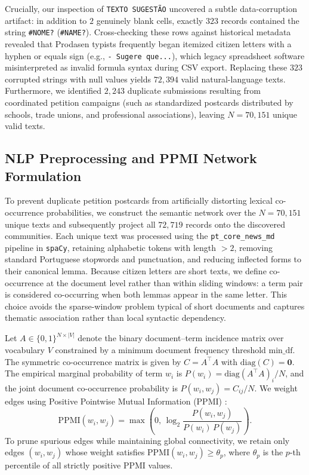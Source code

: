 \documentclass[pdflatex,sn-mathphys,iicol]{sn-jnl}
\begin{document}
Crucially, our inspection of \texttt{TEXTO SUGEST\~{A}O} uncovered a subtle data-corruption artifact: in addition to $2$ genuinely blank cells, exactly $323$ records contained the string \texttt{\#NOME?} (\texttt{\#NAME?}). Cross-checking these rows against historical metadata revealed that Prodasen typists frequently began itemized citizen letters with a hyphen or equals sign (e.g., \texttt{- Sugere que...}), which legacy spreadsheet software misinterpreted as invalid formula syntax during CSV export. Replacing these $323$ corrupted strings with null values yields $72,394$ valid natural-language texts. Furthermore, we identified $2,243$ duplicate submissions resulting from coordinated petition campaigns (such as standardized postcards distributed by schools, trade unions, and professional associations), leaving $N = 70,151$ unique valid texts.

\subsection{NLP Preprocessing and PPMI Network Formulation}
To prevent duplicate petition postcards from artificially distorting lexical co-occurrence probabilities, we construct the semantic network over the $N = 70,151$ unique texts and subsequently project all $72,719$ records onto the discovered communities. Each unique text was processed using the \texttt{pt\_core\_news\_md} pipeline in \texttt{spaCy}, retaining alphabetic tokens with length $>2$, removing standard Portuguese stopwords and punctuation, and reducing inflected forms to their canonical lemma. %
Because citizen letters are short texts, we define co-occurrence at the document level rather than within sliding windows: a term pair is considered co-occurring when both lemmas appear in the same letter. This choice avoids the sparse-window problem typical of short documents and captures thematic association rather than local syntactic dependency.

Let $A \in \{0,1\}^{N \times |V|}$ denote the binary document--term incidence matrix over vocabulary $V$ constrained by a minimum document frequency threshold $\text{min\_df}$. The symmetric co-occurrence matrix is given by $C = A^{\top} A$ with $\text{diag}(C) = \mathbf{0}$. The empirical marginal probability of term $w_i$ is $P(w_i) = \text{diag}(A^{\top}A)_i / N$, and the joint document co-occurrence probability is $P(w_i, w_j) = C_{ij} / N$. We weight edges using Positive Pointwise Mutual Information (PPMI) \citep{church1990word,bullinaria2007extracting}:
\begin{equation}
    \text{PPMI}(w_i, w_j) = \max\left(0, \, \log_2 \frac{P(w_i, w_j)}{P(w_i)\,P(w_j)}\right).
\end{equation}
To prune spurious edges while maintaining global connectivity, we retain only edges $(w_i, w_j)$ whose weight satisfies $\text{PPMI}(w_i, w_j) \ge \theta_p$, where $\theta_p$ is the $p$-th percentile of all strictly positive PPMI values.
\end{document}
